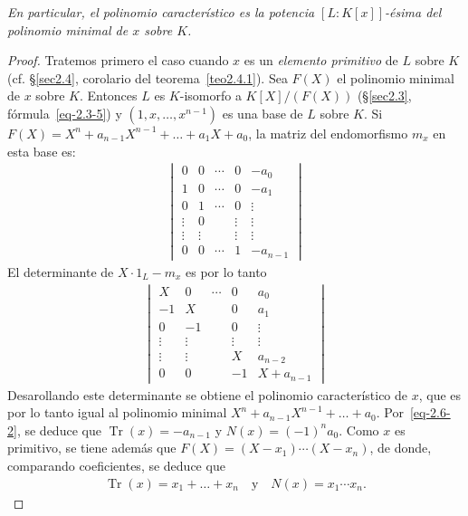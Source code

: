 \documentclass[10pt,oneside,bibtotoc,smallheadings,leqno,a5paper,DIV=12]{scrbook}
\DeclareMathOperator{\Tr}{Tr}
\numberwithin{equation}{section}
\newenvironment{comm}%
	{\begin{trivlist}\item\small\itshape}
	{\end{trivlist}}
\theoremstyle{defi}
\theoremstyle{enonce}
\theoremstyle{rem}
\numberwithin{theorem}{section}
\numberwithin{proposition}{section}
\numberwithin{definition}{section}
\numberwithin{lemma}{section}
\numberwithin{corollary}{section}
\numberwithin{example}{section}
\numberwithin{footnote}{section}%
\begin{document}
\begin{comm}
En particular, el polinomio caracter\'istico es la potencia $[L:K[x]]$-\'esima del
polinomio minimal de $x$
sobre $K$.
\end{comm}

\begin{proof}
Tratemos primero el caso cuando $x$ es un {\em elemento primitivo} de $L$ sobre $K$
(cf. \S\ref{sec2.4}, corolario del teorema~\ref{teo2.4.1}).
Sea $F(X)$ el polinomio minimal de $x$ sobre $K$. Entonces $L$ es $K$-isomorfo a
$K[X]/(F(X))$ (\S\ref{sec2.3}, f\'ormula~\eqref{eq-2.3-5})
y $(1,x,\dots,x^{n-1})$ es una base de $L$ sobre $K$. Si
$F(X) = X^{n}+a_{n-1}X^{n-1}+\dots+a_{1}X+a_{0}$,
la matriz del endomorfismo $m_{x}$ en esta base es:
\begin{gather*}
\begin{vmatrix}
0 & 0 & \cdots & 0 & -a_{0}\\
1 & 0 & \cdots & 0 & -a_{1}\\
0 & 1 & \cdots & 0 & \vdots\\
\vdots & 0 & & \vdots & \vdots\\
\vdots & \vdots & & \vdots & \vdots\\
0 & 0 & \cdots & 1 & -a_{n-1}
\end{vmatrix}
\end{gather*}
El determinante de $X\cdot 1_{L}-m_{x}$ es por lo tanto
\begin{gather*}
\begin{vmatrix}
X & 0 & \cdots & 0 & a_{0}\\
-1 & X & & 0 & a_{1}\\
0 & -1 & & 0 & \vdots\\
\vdots & \vdots & & \vdots & \vdots\\
\vdots & \vdots & & X & a_{n-2}\\
0 & 0 & & -1 & X+a_{n-1}
\end{vmatrix}
\end{gather*}
Desarollando este determinante se obtiene el polinomio caracter\'istico de $x$, que es por lo tanto igual
al polinomio minimal $X^{n}+a_{n-1}X^{n-1}+\dots+a_{0}$. Por~\eqref{eq-2.6-2}, se deduce que $\Tr(x) = -a_{n-1}$
y $N(x) = (-1)^{n}a_{0}$. Como $x$ es primitivo, se tiene adem\'as que $F(X) = (X-x_{1})\cdots(X-x_{n})$, de
donde, comparando coeficientes, se deduce que
\begin{gather*}
\Tr(x) = x_{1}+\dots+x_{n}\quad\text{y}\quad N(x) = x_{1}\cdots x_{n}.
\end{gather*}


\end{proof}
\end{document}
